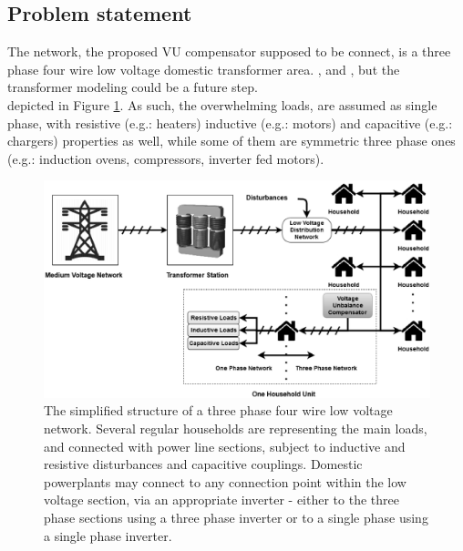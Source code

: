 \subsection{Problem statement}\label{VUB:sec:Statement}

    The network, the proposed VU compensator supposed to be connect, is a three phase four wire low voltage domestic transformer area.  \cite{von2001assessment}, and \cite{smith1988voltage}, but the transformer modeling could be a future step.\\
    depicted in Figure \ref{fig:network}. As such, the overwhelming loads, are assumed as single phase, with resistive (e.g.: heaters) inductive (e.g.: motors) and capacitive (e.g.: chargers) properties as well, while some of them are symmetric three phase ones (e.g.: induction ovens, compressors, inverter fed motors).

    \begin{figure}[!ht]
    \centering
    \includegraphics[width=\textwidth]{Unblance_EPS_Pics/network_gray.eps}
    \caption{The simplified structure of a three phase four wire low voltage network. Several regular households are representing the main loads, and connected with power line sections, subject to inductive and resistive disturbances and capacitive couplings. Domestic powerplants may connect to any connection point within the low voltage section, via an appropriate inverter - either to the three phase sections using a three phase inverter or to a single phase using a single phase inverter.}
    \label{fig:network}
    \end{figure}

